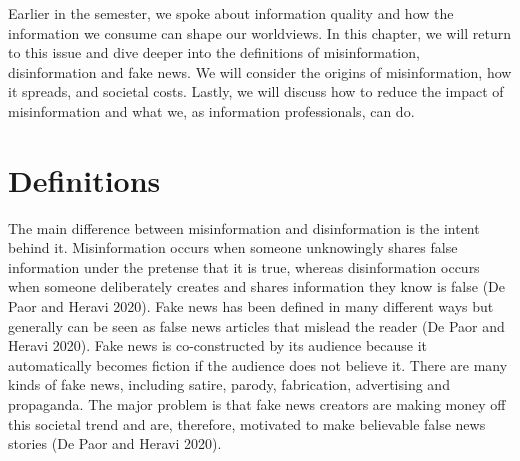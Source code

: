 \documentclass[
  letterpaper,
  DIV=11,
  numbers=noendperiod]{scrreprt}
\begin{document}
Earlier in the semester, we spoke about information quality and how the
information we consume can shape our worldviews. In this chapter, we
will return to this issue and dive deeper into the definitions of
misinformation, disinformation and fake news. We will consider the
origins of misinformation, how it spreads, and societal costs. Lastly,
we will discuss how to reduce the impact of misinformation and what we,
as information professionals, can do.

\section{Definitions}\label{definitions}

The main difference between misinformation and disinformation is the
intent behind it. Misinformation occurs when someone unknowingly shares
false information under the pretense that it is true, whereas
disinformation occurs when someone deliberately creates and shares
information they know is false (De Paor and Heravi 2020). Fake news has
been defined in many different ways but generally can be seen as false
news articles that mislead the reader (De Paor and Heravi 2020). Fake
news is co-constructed by its audience because it automatically becomes
fiction if the audience does not believe it. There are many kinds of
fake news, including satire, parody, fabrication, advertising and
propaganda. The major problem is that fake news creators are making
money off this societal trend and are, therefore, motivated to make
believable false news stories (De Paor and Heravi 2020).
\end{document}
